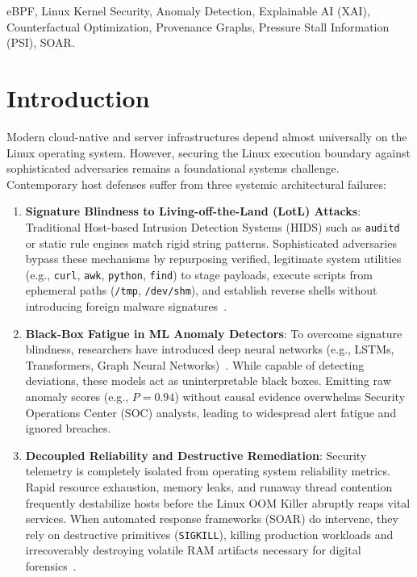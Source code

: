\documentclass[conference]{IEEEtran}
\begin{document}
\begin{IEEEkeywords}
eBPF, Linux Kernel Security, Anomaly Detection, Explainable AI (XAI), Counterfactual Optimization, Provenance Graphs, Pressure Stall Information (PSI), SOAR.
\end{IEEEkeywords}

\section{Introduction}
Modern cloud-native and server infrastructures depend almost universally on the Linux operating system. However, securing the Linux execution boundary against sophisticated adversaries remains a foundational systems challenge. Contemporary host defenses suffer from three systemic architectural failures:

\begin{enumerate}
    \item \textbf{Signature Blindness to Living-off-the-Land (LotL) Attacks}: Traditional Host-based Intrusion Detection Systems (HIDS) such as \texttt{auditd} or static rule engines match rigid string patterns. Sophisticated adversaries bypass these mechanisms by repurposing verified, legitimate system utilities (e.g., \texttt{curl}, \texttt{awk}, \texttt{python}, \texttt{find}) to stage payloads, execute scripts from ephemeral paths (\texttt{/tmp}, \texttt{/dev/shm}), and establish reverse shells without introducing foreign malware signatures~\cite{han2020unicorn, milajerdi2019holmes}.
    \item \textbf{Black-Box Fatigue in ML Anomaly Detectors}: To overcome signature blindness, researchers have introduced deep neural networks (e.g., LSTMs, Transformers, Graph Neural Networks)~\cite{guidotti2018survey}. While capable of detecting deviations, these models act as uninterpretable black boxes. Emitting raw anomaly scores (e.g., $P = 0.94$) without causal evidence overwhelms Security Operations Center (SOC) analysts, leading to widespread alert fatigue and ignored breaches.
    \item \textbf{Decoupled Reliability and Destructive Remediation}: Security telemetry is completely isolated from operating system reliability metrics. Rapid resource exhaustion, memory leaks, and runaway thread contention frequently destabilize hosts before the Linux OOM Killer abruptly reaps vital services. When automated response frameworks (SOAR) do intervene, they rely on destructive primitives (\texttt{SIGKILL}), killing production workloads and irrecoverably destroying volatile RAM artifacts necessary for digital forensics~\cite{weiner2020psi}.
\end{enumerate}
\end{document}
